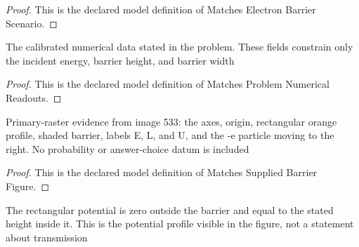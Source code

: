 \begin{proof}
  This is the declared model definition of Matches Electron Barrier Scenario.
\end{proof}
\begin{definition}
  \label{def:physics:phyx-mini-0533:phyxminiproblems-problemphyxmini0533-matchesproblemnumericalreadouts}
  The calibrated numerical data stated in the problem. These fields constrain only the incident energy, barrier height, and barrier width
\end{definition}
\begin{proof}
  This is the declared model definition of Matches Problem Numerical Readouts.
\end{proof}
\begin{definition}
  \label{def:physics:phyx-mini-0533:phyxminiproblems-problemphyxmini0533-matchessuppliedbarrierfigure}
  Primary-raster evidence from image 533: the axes, origin, rectangular orange profile, shaded barrier, labels E, L, and U, and the -e particle moving to the right. No probability or answer-choice datum is included
\end{definition}
\begin{proof}
  This is the declared model definition of Matches Supplied Barrier Figure.
\end{proof}
\begin{definition}
  \label{def:physics:phyx-mini-0533:phyxminiproblems-problemphyxmini0533-satisfiesrectangularpotentialprofile}
  The rectangular potential is zero outside the barrier and equal to the stated height inside it. This is the potential profile visible in the figure, not a statement about transmission
\end{definition}
